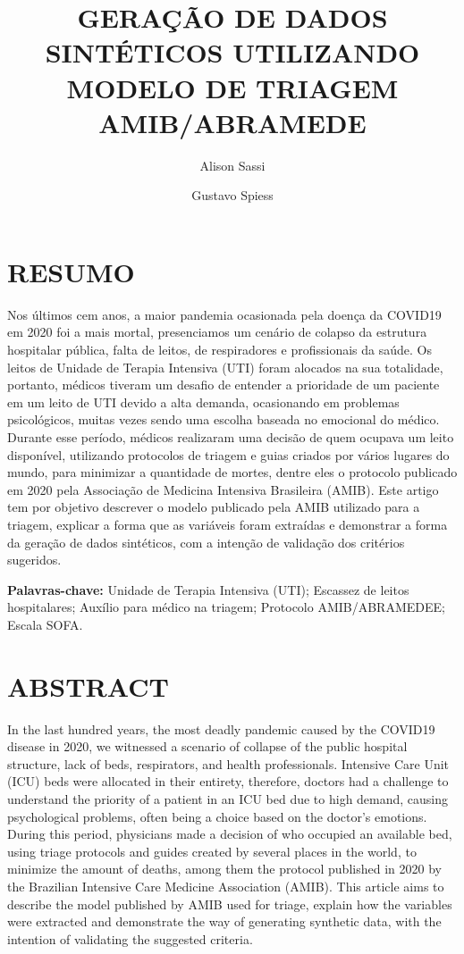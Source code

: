 \documentclass[12pt]{article}
\title{GERAÇÃO DE DADOS SINTÉTICOS UTILIZANDO MODELO DE TRIAGEM AMIB/ABRAMEDE}
\author{Alison Sassi\inst{1} \and Gustavo Spiess\inst{2} }
\begin{document}
\maketitle

\section{RESUMO}

Nos últimos cem anos, a maior pandemia ocasionada pela doença da COVID19 em 2020 foi a mais mortal, presenciamos um cenário de colapso da estrutura hospitalar pública, falta de leitos, de respiradores e profissionais da saúde. Os leitos de Unidade de Terapia Intensiva (UTI) foram alocados na sua totalidade, portanto, médicos tiveram um desafio de entender a prioridade de um paciente em um leito de UTI devido a alta demanda, ocasionando em problemas psicológicos, muitas vezes sendo uma escolha baseada no emocional do médico. Durante esse período, médicos realizaram uma decisão de quem ocupava um leito disponível, utilizando protocolos de triagem e guias criados por vários lugares do mundo, para minimizar a quantidade de mortes, dentre eles o protocolo publicado em 2020 pela Associação de Medicina Intensiva Brasileira (AMIB). Este artigo tem por objetivo descrever o modelo publicado pela AMIB utilizado para a triagem, explicar a forma que as variáveis foram extraídas e demonstrar a forma da geração de dados sintéticos, com a intenção de validação dos critérios sugeridos.

\textbf{Palavras-chave:} Unidade de Terapia Intensiva (UTI); Escassez de leitos hospitalares; Auxílio para médico na triagem; Protocolo AMIB/ABRAMEDEE; Escala SOFA.

\section{ABSTRACT} 

In the last hundred years, the most deadly pandemic caused by the COVID19 disease in 2020, we witnessed a scenario of collapse of the public hospital structure, lack of beds, respirators, and health professionals. Intensive Care Unit (ICU) beds were allocated in their entirety, therefore, doctors had a challenge to understand the priority of a patient in an ICU bed due to high demand, causing psychological problems, often being a choice based on the doctor's emotions. During this period, physicians made a decision of who occupied an available bed, using triage protocols and guides created by several places in the world, to minimize the amount of deaths, among them the protocol published in 2020 by the Brazilian Intensive Care Medicine Association (AMIB). This article aims to describe the model published by AMIB used for triage, explain how the variables were extracted and demonstrate the way of generating synthetic data, with the intention of validating the suggested criteria.
\end{document}
